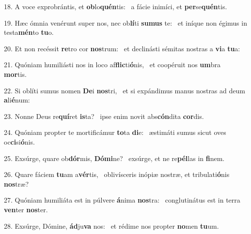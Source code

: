 18. A voce exprobrántis, et \textbf{ob}lo\textbf{quén}tis: \ast\  a fácie inimíci, et \textbf{per}se\textbf{quén}tis.\

19. Hæc ómnia venérunt super nos, nec ob\textbf{lí}ti \textbf{su}\textbf{mus} te: \ast\  et iníque non égimus in testa\textbf{mén}to \textbf{tu}o.\

20. Et non recéssit \textbf{re}tro cor \textbf{nos}trum: \ast\  et declinásti sémitas nostras a \textbf{vi}a \textbf{tu}a:\

21. Quóniam humiliásti nos in loco af\textbf{flic}ti\textbf{ó}nis, \ast\  et coopéruit nos \textbf{um}bra \textbf{mor}tis.\

22. Si oblíti sumus nomen \textbf{De}i \textbf{nos}tri, \ast\  et si expándimus manus nostras ad deum \textbf{a}li\textbf{é}num:\

23. Nonne Deus re\textbf{quí}ret \textbf{is}ta? \ast\  ipse enim novit abs\textbf{cón}dita \textbf{cor}dis.\

24. Quóniam propter te mortificámur \textbf{to}ta \textbf{di}e: \ast\  æstimáti sumus sicut oves oc\textbf{ci}si\textbf{ó}nis.\

25. Exsúrge, quare ob\textbf{dór}mis, \textbf{Dó}\textbf{mi}ne? \ast\  exsúrge, et ne re\textbf{pél}las in \textbf{fi}nem.\

26. Quare fáciem \textbf{tu}am a\textbf{vér}tis, \ast\  oblivísceris inópiæ nostræ, et tribulati\textbf{ó}nis \textbf{nos}træ?\

27. Quóniam humiliáta est in púlvere \textbf{á}nima \textbf{nos}tra: \ast\  conglutinátus est in terra \textbf{ven}ter \textbf{nos}ter.\

28. Exsúrge, Dómine, \textbf{ád}ju\textbf{va} nos: \ast\  et rédime nos propter \textbf{no}men \textbf{tu}um.\

